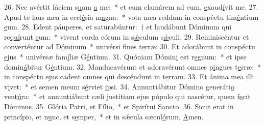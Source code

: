 26. Nec avértit fáciem s\uline{u}am \uline{a} me:~* et cum clamárem ad eum, \uline{e}xaud\uline{í}vit me.
27. Apud te laus mea in eccl\uline{é}sia m\uline{a}gna:~* vota mea reddam in conspéctu tim\uline{é}ntium \uline{e}um.
28. Edent páuperes, et saturabúntur:~† et laudábunt Dóminum qui re\uline{quí}runt \uline{e}um:~* vivent corda eórum in s\uline{ǽ}culum s\uline{ǽ}culi.
29. Reminiscéntur et converténtur ad D\uline{ó}m\uline{i}num~* univérsi f\uline{i}nes t\uline{e}rræ:
30. Et adorábunt in consp\uline{é}ctu \uline{e}jus~* univérsæ fam\uline{í}liæ G\uline{é}ntium.
31. Quóniam Dómin\uline{i} est r\uline{e}gnum:~* et ipse domin\uline{á}bitur G\uline{é}ntium.
32. Manducavérunt et adoravérunt omnes p\uline{i}ngues t\uline{e}rræ:~* in conspéctu ejus cadent omnes qui desc\uline{é}ndunt in t\uline{e}rram.
33. Et ánima mea \uline{i}lli v\uline{i}vet:~* et semen meum s\uline{é}rviet \uline{i}psi.
34. Annuntiábitur Dómino generáti\uline{o} vent\uline{ú}ra:~* et annuntiábunt cæli justítiam ejus pópulo qui nascétur, quem f\uline{e}cit D\uline{ó}minus.
35. Glória Patri, et F\uline{í}l\uline{i}o,~* et Spir\uline{í}tui S\uline{a}ncto.
36. Sicut erat in princípio, et n\uline{u}nc, et s\uline{e}mper,~* et in sǽcula sæcul\uline{ó}rum. \uline{A}men.
